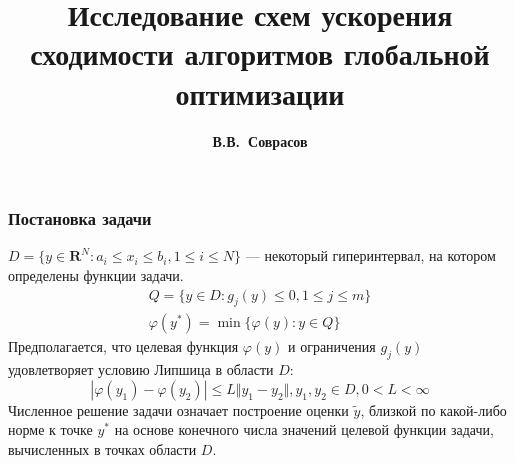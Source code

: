 \documentclass[aspectratio=169]{beamer}
\title{Исследование схем ускорения сходимости алгоритмов глобальной оптимизации}
\author{\textbf{В.В.~Соврасов}}
\institute{ННГУ им. Н.И. Лобачевского}
\date{}
\begin{document}
\begin{frame}
\titlepage
\end{frame}

\begin{frame}
  \frametitle{Постановка задачи}
    \(D=\{y\in \mathbf{R}^N:a_i\leqslant x_i\leqslant{b_i}, 1\leqslant{i}\leqslant{N}\}\) ---
    некоторый гиперинтервал, на котором определены функции задачи.
  \begin{displaymath}
    \begin{array}{c}
      Q=\{y\in D: g_j(y)\leqslant 0,  1\leqslant{j}\leqslant{m}\}  \\
      \varphi(y^*)=\min\{\varphi(y):y\in Q\}
    \end{array}
  \end{displaymath}
  Предполагается, что целевая функция \(\varphi(y)\) и ограничения \(g_j(y)\) удовлетворяет условию Липшица в области \(D\):
  \begin{displaymath}
  |\varphi(y_1)-\varphi(y_2)|\leqslant L\Vert y_1-y_2\Vert,y_1,y_2\in D,0<L<\infty
  \end{displaymath}
  Численное решение задачи означает построение оценки \(\widetilde{y}\), близкой по какой-либо
  норме к точке \(y^*\) на основе конечного числа значений целевой функции задачи,
  вычисленных в точках области \(D\).
\end{frame}
\end{document}
